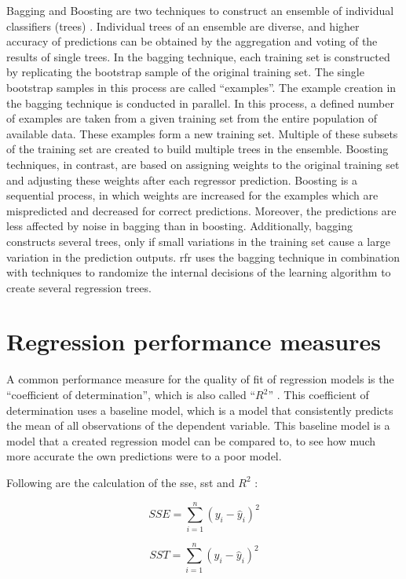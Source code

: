 \documentclass[a4paper, 11pt, oneside]{Thesis}  %
\begin{document}
Bagging and Boosting are two techniques to construct an ensemble of individual classifiers (trees) \cite{Dietterich.2000}. Individual trees of an ensemble are diverse, and higher accuracy of predictions can be obtained by the aggregation and voting of the results of single trees. In the bagging technique, each training set is constructed by replicating the bootstrap sample of the original training set. The single bootstrap samples in this process are called “examples”. The example creation in the bagging technique is conducted in parallel. In this process, a defined number of examples are taken from a given training set from the entire population of available data. These examples form a new training set. Multiple of these subsets of the training set are created to build multiple trees in the ensemble. Boosting techniques, in contrast, are based on assigning weights to the original training set and adjusting these weights after each regressor prediction. Boosting is a sequential process, in which weights are increased for the examples which are mispredicted and decreased for correct predictions. Moreover, the predictions are less affected by noise in bagging than in boosting. Additionally, bagging constructs several trees, only if small variations in the training set cause a large variation in the prediction outputs. \ac{rfr} uses the bagging technique in combination with techniques to randomize the internal decisions of the learning algorithm to create several regression trees.


\section{Regression performance measures}
\label{sec:Regression performance measures}

A common performance measure for the quality of fit of regression models is the ``coefficient of determination'', which is also called ``$R^2$'' \cite{Devasthali.2018}. This coefficient of determination uses a baseline model, which is a model that consistently predicts the mean of all observations of the dependent variable. This baseline model is a model that a created regression model can be compared to, to see how much more accurate the own predictions were to a poor model.

Following are the calculation of the \ac{sse}, \ac{sst} and $R^2$ \cite{Devasthali.2018}:

\[SSE = \sum\limits_{i=1}^n (y_{i} - \hat{y}_{i})^2\]

\[SST = \sum\limits_{i=1}^n (y_{i} - \hat{y}_{i})^2\]
\end{document}
